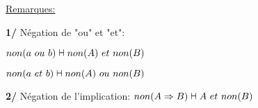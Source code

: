 \documentclass[12pt,twoside,a4paper]{article}
\begin{document}
		\underline{Remarques:}
		\begin{liste}
			\item[\textbf{1/}] N\'egation de "ou" et "et":
				\begin{liste}
					\item $non(a\ ou\ b)\vdashv non(A)\ et\ non(B)$
					\item $non(a\ et\ b)\vdashv non(A)\ ou\ non(B)$
				\end{liste}
			\item[\textbf{2/}] N\'egation de l'implication:
				$non(A\Rightarrow B)\vdashv A\ et\ non(B)$
		\end{liste}
\end{document}
